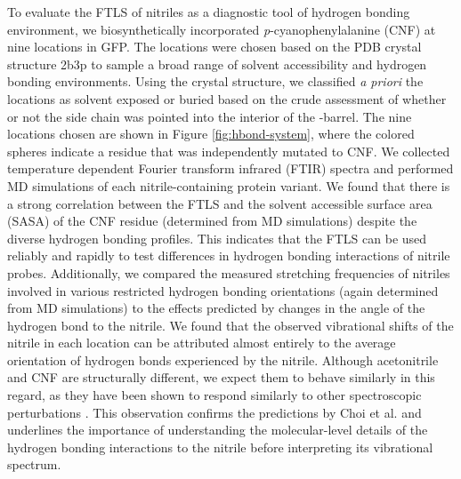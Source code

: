To evaluate the FTLS of nitriles as a diagnostic tool of hydrogen bonding environment, we biosynthetically incorporated \emph{p}-cyanophenylalanine (CNF) at nine locations in GFP.
The locations were chosen based on the PDB crystal structure 2b3p\cite{Pedelacq2006} to sample a broad range of solvent accessibility and hydrogen bonding environments.
Using the crystal structure, we classified \emph{a priori} the locations as solvent exposed or buried based on the crude assessment of whether or not the side chain was pointed into the interior of the \textbeta{}-barrel.
The nine locations chosen are shown in Figure \ref{fig:hbond-system}, where the colored spheres indicate a residue that was independently mutated to CNF.
We collected temperature dependent Fourier transform infrared (FTIR) spectra and performed MD simulations of each nitrile-containing protein variant.
We found that there is a strong correlation between the FTLS and the solvent accessible surface area (SASA) of the CNF residue (determined from MD simulations) despite the diverse hydrogen bonding profiles.
This indicates that the FTLS can be used reliably and rapidly to test differences in hydrogen bonding interactions of nitrile probes.
Additionally, we compared the measured stretching frequencies of nitriles involved in various restricted hydrogen bonding orientations (again determined from MD simulations) to the effects predicted by changes in the angle of the hydrogen bond to the nitrile.
We found that the observed vibrational shifts of the nitrile in each location can be attributed almost entirely to the average orientation of hydrogen bonds experienced by the nitrile.
Although acetonitrile and CNF are structurally different, we expect them to behave similarly in this regard, as they have been shown to respond similarly to other spectroscopic perturbations \cite{Getahun2003}.
This observation confirms the predictions by Choi et al. and underlines the importance of understanding the molecular-level details of the hydrogen bonding interactions to the nitrile  before interpreting its vibrational spectrum.

